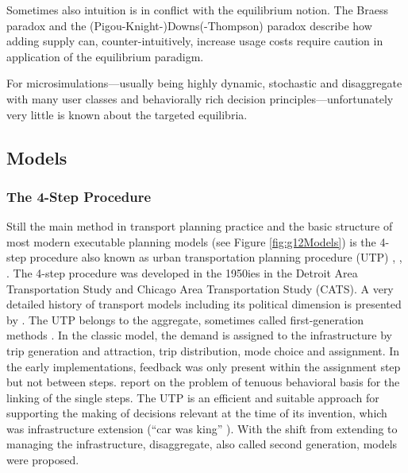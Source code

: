Sometimes also intuition is in conflict with the equilibrium notion. The Braess paradox \citep[][]{Braess_UF_1969} and the (Pigou-Knight-)Downs(-Thompson) paradox \citep[e.g.,][]{Downs_TQLY_1962} describe how adding supply can, counter-intuitively, increase usage costs require caution in application of the equilibrium paradigm.

For microsimulations---usually being highly dynamic, stochastic and disaggregate with many user classes and behaviorally rich decision principles---unfortunately very little is known about the targeted equilibria.

\subsection{Models}
\label{sec:models}
\subsubsection{The 4-Step Procedure}
Still the main method in transport planning practice and the basic structure of most modern executable planning models (see Figure \ref{fig:g12Models}) is the 4-step procedure also known as urban transportation planning procedure (UTP) \citep[][p.17ff]{Bates_HensherButton_2000}, \citep[][p.2]{CFD_TRB_2007}, \citep[][]{McNally_HensherButton_2000}. The 4-step procedure was developed in the 1950ies in the Detroit Area Transportation Study and Chicago Area Transportation Study (CATS). A very detailed history of transport models including its political dimension is presented by \citet[][]{Weiner_2008}. The UTP belongs to the aggregate, sometimes called first-generation methods \citep[][p.20ff]{OrtuzarWillumsen_2001}. In the classic model, the demand is assigned to the infrastructure by trip generation and attraction, trip distribution, mode choice and assignment. In the early implementations, feedback was only present within the assignment step but not between steps. \citet[][p.27]{BoyceWilliams_ERSA_2003} report on the problem of tenuous behavioral basis for the linking of the single steps. The UTP is an efficient and suitable approach for supporting the making of decisions relevant at the time of its invention, which was infrastructure extension \citep[][Section 2]{Kitamura_TMIP_1996} (``car was king'' \citep[][]{Daly_unpub_STRC_2013}). With the shift from extending to managing the infrastructure, disaggregate, also called second generation, models were proposed. 

